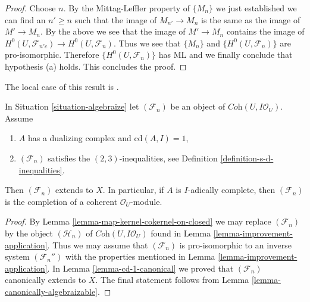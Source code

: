 \begin{proof}
\medskip\noindent
Choose $n$. By the Mittag-Leffler property of $\{M_n\}$ we just established
we can find an $n' \geq n$ such that the image of $M_{n'} \to M_n$
is the same as the image of $M' \to M_n$. By the above we see that
the image of $M' \to M_n$ contains the image of
$H^0(U, \mathcal{F}_{n'c}) \to H^0(U, \mathcal{F}_n)$.
Thus we see that $\{M_n\}$ and $\{H^0(U, \mathcal{F}_n)\}$
are pro-isomorphic. Therefore $\{H^0(U, \mathcal{F}_n)\}$
has ML and we finally conclude that hypothesis (a) holds.
This concludes the proof.
\end{proof}

\begin{proposition}
\label{proposition-cd-1}
\begin{reference}
The local case of this result is \cite[IV Corollaire 2.9]{MRaynaud-book}.
\end{reference}
In Situation \ref{situation-algebraize} let $(\mathcal{F}_n)$
be an object of $\textit{Coh}(U, I\mathcal{O}_U)$. Assume
\begin{enumerate}
\item $A$ has a dualizing complex and $\text{cd}(A, I) = 1$,
\item $(\mathcal{F}_n)$ satisfies the $(2, 3)$-inequalities, see
Definition \ref{definition-s-d-inequalities}.
\end{enumerate}
Then $(\mathcal{F}_n)$ extends to $X$. In particular, if $A$ is
$I$-adically complete, then $(\mathcal{F}_n)$ is the completion
of a coherent $\mathcal{O}_U$-module.
\end{proposition}

\begin{proof}
By Lemma \ref{lemma-map-kernel-cokernel-on-closed}
we may replace $(\mathcal{F}_n)$ by the object $(\mathcal{H}_n)$
of $\textit{Coh}(U, I\mathcal{O}_U)$ found in
Lemma \ref{lemma-improvement-application}.
Thus we may assume that $(\mathcal{F}_n)$ is pro-isomorphic
to an inverse system $(\mathcal{F}_n'')$ with the properties
mentioned in Lemma \ref{lemma-improvement-application}.
In Lemma \ref{lemma-cd-1-canonical} we proved that
$(\mathcal{F}_n)$ canonically extends to $X$.
The final statement follows from Lemma \ref{lemma-canonically-algebraizable}.
\end{proof}

